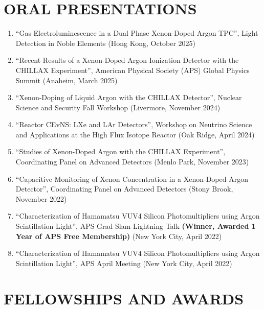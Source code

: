 \documentclass[11pt,letterpaper]{article}
\newenvironment{publist}
  {\begin{enumerate}[leftmargin=2.2em, topsep=2pt, itemsep=6pt, parsep=0pt]}
  {\end{enumerate}}
\begin{document}
\section*{ORAL PRESENTATIONS}

\begin{publist}
  \item ``Gas Electroluminescence in a Dual Phase Xenon-Doped Argon TPC'', Light
        Detection in Noble Elements (Hong Kong, October 2025)

  \item ``Recent Results of a Xenon-Doped Argon Ionization Detector with the CHILLAX
        Experiment'', American Physical Society (APS) Global Physics Summit
        (Anaheim, March 2025)

  \item ``Xenon-Doping of Liquid Argon with the CHILLAX Detector'', Nuclear Science and
        Security Fall Workshop (Livermore, November 2024)

  \item ``Reactor CEvNS: LXe and LAr Detectors'', Workshop on Neutrino Science and
        Applications at the High Flux Isotope Reactor (Oak Ridge, April 2024)

  \item ``Studies of Xenon-Doped Argon with the CHILLAX Experiment'', Coordinating Panel
        on Advanced Detectors (Menlo Park, November 2023)

  \item ``Capacitive Monitoring of Xenon Concentration in a Xenon-Doped Argon
        Detector'', Coordinating Panel on Advanced Detectors (Stony Brook,
        November 2022)

  \item ``Characterization of Hamamatsu VUV4 Silicon Photomultipliers using Argon
        Scintillation Light'', APS Grad Slam Lightning Talk \textbf{(Winner, Awarded
        1 Year of APS Free Membership)} (New York City, April 2022)

  \item ``Characterization of Hamamatsu VUV4 Silicon Photomultipliers using Argon
        Scintillation Light'', APS April Meeting (New York City, April 2022)
\end{publist}

\section*{FELLOWSHIPS AND AWARDS}
\end{document}

